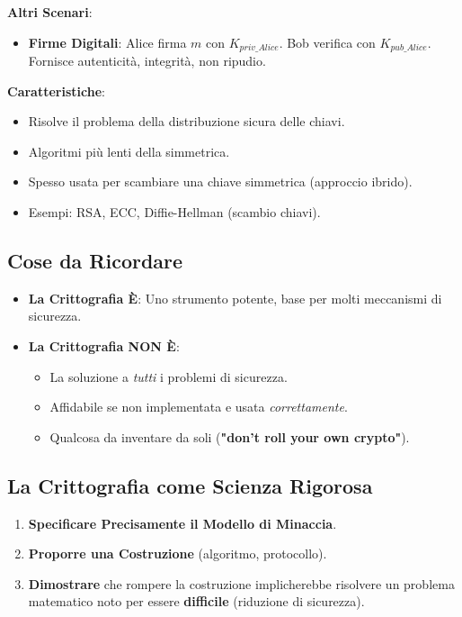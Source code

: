 \textbf{Altri Scenari}:
\begin{itemize}
    \item \textbf{Firme Digitali}: Alice firma $m$ con $K_{priv\_Alice}$. Bob verifica con $K_{pub\_Alice}$. Fornisce autenticità, integrità, non ripudio.
\end{itemize}
\textbf{Caratteristiche}:
\begin{itemize}
    \item Risolve il problema della distribuzione sicura delle chiavi.
    \item Algoritmi più lenti della simmetrica.
    \item Spesso usata per scambiare una chiave simmetrica (approccio ibrido).
    \item Esempi: RSA, ECC, Diffie-Hellman (scambio chiavi).
\end{itemize}

\subsection{Cose da Ricordare}
\begin{itemize}
    \item \textbf{La Crittografia È}: Uno strumento potente, base per molti meccanismi di sicurezza.
    \item \textbf{La Crittografia NON È}:
    \begin{itemize}
        \item La soluzione a \textit{tutti} i problemi di sicurezza.
        \item Affidabile se non implementata e usata \textit{correttamente}.
        \item Qualcosa da inventare da soli (\textbf{"don't roll your own crypto"}).
    \end{itemize}
\end{itemize}

\subsection{La Crittografia come Scienza Rigorosa}
\begin{enumerate}
    \item \textbf{Specificare Precisamente il Modello di Minaccia}.
    \item \textbf{Proporre una Costruzione} (algoritmo, protocollo).
    \item \textbf{Dimostrare} che rompere la costruzione implicherebbe risolvere un problema matematico noto per essere \textbf{difficile} (riduzione di sicurezza).
\end{enumerate}

